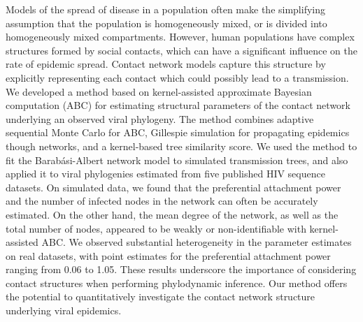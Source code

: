 Models of the spread of disease in a population often make the simplifying
assumption that the population is homogeneously mixed, or is divided into
homogeneously mixed compartments. However, human populations have complex
structures formed by social contacts, which can have a significant influence on
the rate of epidemic spread. Contact network models capture this structure by
explicitly representing each contact which could possibly lead to a
transmission. We developed a method based on kernel-assisted approximate
Bayesian computation (ABC) for estimating structural parameters of the contact
network underlying an observed viral phylogeny. The method combines adaptive
sequential Monte Carlo for ABC, Gillespie simulation for propagating epidemics
though networks, and a kernel-based tree similarity score. We used the method
to fit the Barab\'{a}si-Albert network model to simulated transmission trees,
and also applied it to viral phylogenies estimated from five published HIV
sequence datasets. On simulated data, we found that the preferential attachment
power and the number of infected nodes in the network can often be accurately
estimated. On the other hand, the mean degree of the network, as well as the
total number of nodes, appeared to be weakly or non-identifiable with
kernel-assisted ABC. We observed substantial heterogeneity in the parameter
estimates on real datasets, with point estimates for the preferential
attachment power ranging from 0.06 to 1.05. These results underscore the
importance of considering contact structures when performing phylodynamic
inference. Our method offers the potential to quantitatively investigate the
contact network structure underlying viral epidemics.
